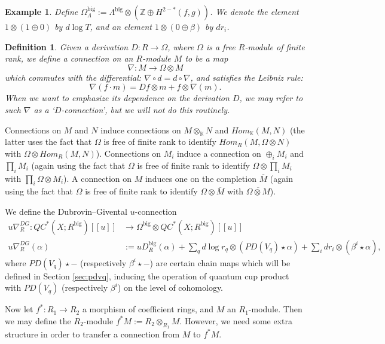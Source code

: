 \documentclass{article}
\newtheorem{eg}[lem]{Example}
\newtheorem{defn}[lem]{Definition}
\def\BbK{\mathbb{K}}
\def\nov{r}
\def\Z{\mathbb{Z}}
\def\big{{\operatorname{big}}}
\begin{document}
\begin{eg}
    Define $\Omega^\big_\Lambda := \Lambda^\big \otimes \left(\Z \oplus H^{2-*}(f,g) \right)$. 
    We denote the element $1 \otimes (1 \oplus 0)$ by $d\log T$, and an element $1 \otimes (0 \oplus \beta)$ by $d\nov_i$.
\end{eg}

\begin{defn}\label{def:conn}
    Given a derivation $D:R \to \Omega$, where $\Omega$ is a free $R$-module of finite rank, we define a \emph{connection} on an $R$-module $M$ to be a map
    $$\nabla:M \to \Omega \otimes M $$
    which commutes with the differential: $\nabla \circ d = d \circ \nabla$, and satisfies the Leibniz rule:
    $$\nabla(f \cdot m) = Df \otimes m + f \otimes \nabla(m).$$
    When we want to emphasize its dependence on the derivation $D$, we may refer to such $\nabla$ as a `$D$-connection', but we will not do this routinely.
\end{defn}

Connections on $M$ and $N$ induce connections on $M \otimes_\BbK N$ and $Hom_\BbK(M,N)$ (the latter uses the fact that $\Omega$ is free of finite rank to identify $Hom_R(M,\Omega \otimes N)$ with $\Omega \otimes Hom_R(M,N)$).
Connections on $M_i$ induce a connection on $\oplus_i M_i$ and $\prod_i M_i$ (again using the fact that $\Omega$ is free of finite rank to identify $\Omega \otimes \prod_i M_i$ with $\prod_i \Omega \otimes M_i$). 
A connection on $M$ induces one on the completion $\overline{M}$ (again using the fact that $\Omega$ is free of finite rank to identify $\Omega \otimes \overline{M}$ with $\overline{\Omega \otimes M}$). 

We define the Dubrovin--Givental $u$-connection 
\begin{align*}
    u\nabla^{DG}_R: QC^*(X;R^\big)[[u]] & \to \Omega^\big \otimes QC^*(X;R^\big)[[u]]\\
    u\nabla^{DG}_R(\alpha) & := uD^\big_R(\alpha) + \sum_q d\log \nov_q \otimes (PD(V_q) \star \alpha)  + \sum_i d\nov_i \otimes (\beta^i \star \alpha),
\end{align*}
where $PD(V_q) \star -$ (respectively $\beta^i \star -$) are certain chain maps which will be defined in Section \ref{sec:pdvq}, inducing the operation of quantum cup product with $PD(V_q)$ (respectively $\beta^i$) on the level of cohomology. 

Now let $f^*:R_1 \to R_2$ a morphism of coefficient rings, and $M$ an $R_1$-module. 
Then we may define the $R_2$-module $f^*M := R_2 \otimes_{R_1} M$. 
However, we need some extra structure in order to transfer a connection from $M$ to $f^*M$. 
\end{document}
